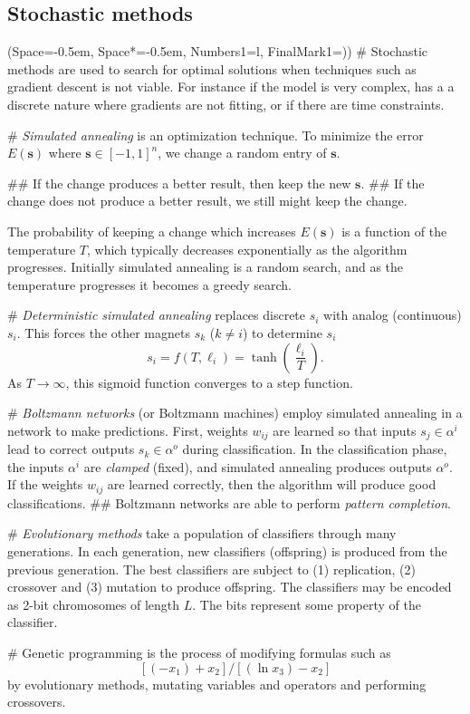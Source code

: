 \documentclass[12pt, a4paper]{article}
\newcommand{\listSpace}{-0.5em}%
\newcommand{\vect}[1]{\bm{#1}}
\begin{document}
\subsection{Stochastic methods}
\begin{easylist}[itemize]
\ListProperties(Space=\listSpace, Space*=\listSpace, Numbers1=l, FinalMark1={)})
# Stochastic methods are used to search for optimal solutions when techniques such as gradient descent is not viable.
For instance if the model is very complex, has a a discrete nature where gradients are not fitting, or if there are time constraints.

# \emph{Simulated annealing} is an optimization technique.
To minimize the error $E(\vect{s})$ where $\vect{s} \in [-1, 1]^n$, we change a random entry of $\vect{s}$.
\begin{easylist}
## If the change produces a better result, then keep the new $\vect{s}$.
## If the change does not produce a better result, we still might keep the change. 
\end{easylist}
The probability of keeping a change which increases $E(\vect{s})$ is a function of the temperature $T$, which typically decreases exponentially as the algorithm progresses.
Initially simulated annealing is a random search, and as the temperature progresses it becomes a greedy search.

# \emph{Deterministic simulated annealing} replaces discrete $s_i$ with analog (continuous) $s_i$.
This forces the other magnets $s_k$ ($k \neq i$) to determine $s_i$
\begin{equation*}
	s_i = f(T, \ell_i) = \tanh \left( \frac{\ell_i}{T} \right).
\end{equation*}
As $T \to \infty$, this sigmoid function converges to a step function.

# \emph{Boltzmann networks} (or Boltzmann machines) employ simulated annealing in a network to make predictions.
First, weights $w_{ij}$ are learned so that inputs $s_j \in \alpha^i$ lead to correct outputs $s_k \in \alpha^o$ during classification.
In the classification phase, the inputs $\alpha^i$ are \emph{clamped} (fixed), and simulated annealing produces outputs $\alpha^o$.
If the weights $w_{ij}$ are learned correctly, then the algorithm will produce good classifications.
## Boltzmann networks are able to perform \emph{pattern completion}. 

# \emph{Evolutionary methods} take a population of classifiers through many generations.
In each generation, new classifiers (offspring) is produced from the previous generation.
The best classifiers are subject to (1) replication, (2) crossover and (3) mutation to produce offspring.
The classifiers may be encoded as 2-bit chromosomes of length $L$.
The bits represent some property of the classifier.


# Genetic programming is the process of modifying formulas such as
\begin{equation*}
	\left[ (- x_1) + x_2 \right] / \left[ ( \ln x_3) - x_2 \right]
\end{equation*}
by evolutionary methods, mutating variables and operators and performing crossovers.
\end{easylist}
\end{document}
